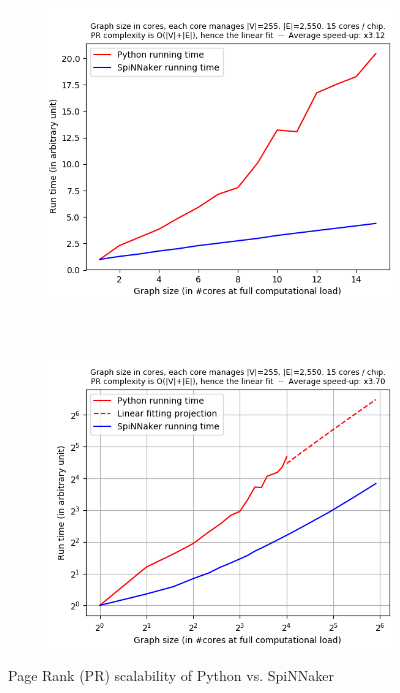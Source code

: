 \begin{figure}[!ht]
    \centering
    \begin{subfigure}[b]{0.5\textwidth}
        \includegraphics[width=\textwidth]{figures/graph_size_vs_running_time-1.png}
        \caption{} \label{fig:graph31}
    \end{subfigure}%
    ~ %
    \begin{subfigure}[b]{0.5\textwidth}
        \includegraphics[width=\textwidth]{figures/graph_size_vs_running_time-2.png}
        \caption{} \label{fig:graph32}
    \end{subfigure}
    \caption{Page Rank (PR) scalability of Python vs. SpiNNaker}
    \label{fig:graph3}
\end{figure} 

